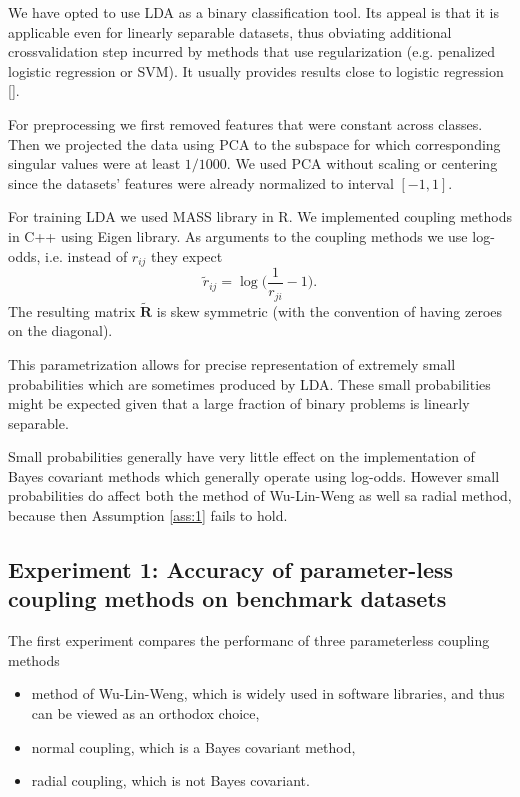 \documentclass[twoside,11pt]{article}
\begin{document}
We have opted to use LDA as a binary classification tool. Its appeal is that it is applicable even for linearly separable datasets, thus obviating additional crossvalidation step incurred by methods that use regularization (e.g. penalized logistic regression or SVM). It usually provides results close to logistic regression [\cite{james2013introduction}].

For preprocessing we first removed features that were constant across classes. Then we projected the data using PCA to the subspace for which corresponding singular values were at least $1/1000$. We used PCA without scaling or centering since the datasets' features were already normalized to interval $[-1,1]$. 

For training LDA we used MASS library in R. We implemented coupling methods in C++ using Eigen library. As arguments to the coupling methods we use log-odds, i.e. instead of $r_{ij}$ they expect
$$
\tilde r_{ij} = \log \biggl(\frac{1}{r_{ji}} - 1\biggr).
$$
The resulting matrix $\tilde{\boldsymbol{R}}$ is skew symmetric (with the convention of having zeroes on the diagonal).

This parametrization allows for precise representation of extremely small probabilities which are sometimes produced by LDA. These small probabilities might be expected given that a large fraction of binary problems is linearly separable. 

Small probabilities generally have very little effect on the implementation of Bayes covariant methods which generally operate using log-odds. However small probabilities do affect both the method of Wu-Lin-Weng as well sa radial method, because then Assumption \ref{ass:1} fails to hold. 


\subsection{Experiment 1: Accuracy of parameter-less coupling methods on benchmark datasets} \label{sec:exp1}

The first experiment compares the performanc of three parameterless coupling methods
\begin{itemize}
\item method of Wu-Lin-Weng, which is widely used in software libraries, and thus can be viewed as an orthodox choice,
\item normal coupling, which is a Bayes covariant method,
\item radial coupling, which is not Bayes covariant.
\end{itemize}
\end{document}
